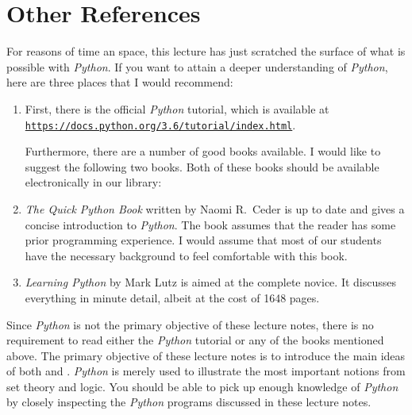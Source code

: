 \section{Other References}
For reasons of time an space, this lecture has just scratched the surface of what is possible with
\textsl{Python}.  If you want to attain a deeper understanding of \textsl{Python}, here are three places that 
I would recommend:
\begin{enumerate}
\item First, there is the official \textsl{Python} tutorial, which is available at
      \\[0.2cm]
      \hspace*{1.3cm}
      \href{https://docs.python.org/3.6/tutorial/index.html}{\texttt{https://docs.python.org/3.6/tutorial/index.html}}.

      Furthermore, there are a number of good books available.  I would like to suggest the following two
      books.  Both of these books should be available electronically in our library:
\item \emph{The Quick Python Book} written by Naomi R.~Ceder \cite{ceder:2018} is up to date and gives a
      concise introduction to \textsl{Python}.  The book assumes that the reader has some prior programming
      experience.  I would assume that most of our students have the necessary background to feel comfortable
      with this book.
\item \emph{Learning Python} by Mark Lutz \cite{lutz:2013} is aimed at the complete novice.  It discusses
      everything in minute detail, albeit at the cost of 1648 pages.
\end{enumerate}
Since \textsl{Python} is not the primary objective of these lecture notes, there is no requirement to read
either the \textsl{Python} tutorial or any of the books mentioned above.  The primary objective of these
lecture notes is to introduce the main ideas of both  and .
\textsl{Python} is merely used to illustrate the most important notions from set theory and logic.  You should
be able to pick up enough knowledge of \textsl{Python} by closely inspecting the \textsl{Python} programs
discussed in these lecture notes.  


